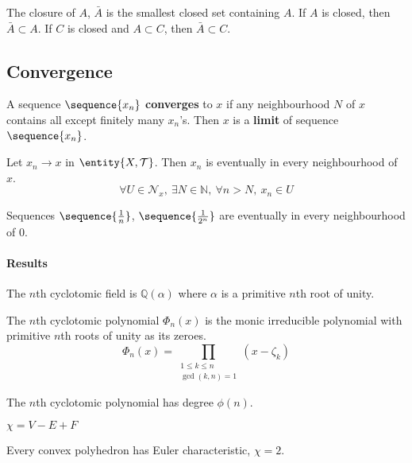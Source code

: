 \begin{note}
	The closure of $A$, $\bar{A}$ is the smallest closed set containing $A$.
	If $A$ is closed, then $\bar{A} \subset A$.
	If $C$ is closed and $A \subset C$, then $\bar{A} \subset C$.
\end{note}

\subsection{Convergence}
\begin{definition}[neighbourhood]
	A sequence $\sequence{x_n}$ \textbf{converges} to $x$ if any neighbourhood $N$ of $x$ contains all except finitely many $x_n$'s.
	Then $x$ is a \textbf{limit} of sequence $\sequence{x_n}$.
\end{definition}
\begin{note}
	Let $x_n \to x$ in $\entity{X,\mathcal{T}}$.
	Then $x_n$ is eventually in every neighbourhood of $x$.
	\begin{equation}
		\forall U \in \mathcal{N}_x,\ \exists N \in \mathbb{N},\ \forall n > N,\ x_n \in U
	\end{equation}
\end{note}

\begin{note}
	Sequences $\sequence{\frac{1}{n}}$, $\sequence{\frac{1}{2^n}}$ are eventually in every neighbourhood of $0$.
\end{note}


\paragraph{Results}
\begin{definition}
	The $n$th cyclotomic field is $\mathbb{Q}(\alpha)$ where $\alpha$ is a primitive $n$th root of unity.
\end{definition}

\begin{definition}
	The $n$th cyclotomic polynomial $\Phi_n(x)$ is the monic irreducible polynomial with primitive $n$th roots of unity as its zeroes.
	$$ \Phi_n(x) = \prod_{\substack{1 \le k \le n \\ \gcd(k,n)=1}} \!\!\!\!\!\left(x-\zeta_k\right)$$
\end{definition}
	The $n$th cyclotomic polynomial has degree $\phi(n)$.

\begin{definition}
	$\chi = V - E + F$
\end{definition}
\begin{remark}
	Every convex polyhedron has Euler characteristic, $\chi = 2$.
\end{remark}

